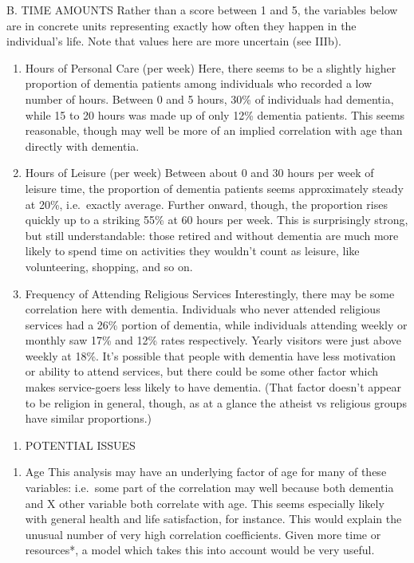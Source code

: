 \documentclass[]{article}
\providecommand{\tightlist}{%
  \setlength{\itemsep}{0pt}\setlength{\parskip}{0pt}}
\begin{document}
B. TIME AMOUNTS Rather than a score between 1 and 5, the variables below
are in concrete units representing exactly how often they happen in the
individual's life. Note that values here are more uncertain (see IIIb).

\begin{enumerate}
\def\labelenumi{\alph{enumi}.}
\item
  Hours of Personal Care (per week) Here, there seems to be a slightly
  higher proportion of dementia patients among individuals who recorded
  a low number of hours. Between 0 and 5 hours, 30\% of individuals had
  dementia, while 15 to 20 hours was made up of only 12\% dementia
  patients. This seems reasonable, though may well be more of an implied
  correlation with age than directly with dementia.
\item
  Hours of Leisure (per week) Between about 0 and 30 hours per week of
  leisure time, the proportion of dementia patients seems approximately
  steady at 20\%, i.e.~exactly average. Further onward, though, the
  proportion rises quickly up to a striking 55\% at 60 hours per week.
  This is surprisingly strong, but still understandable: those retired
  and without dementia are much more likely to spend time on activities
  they wouldn't count as leisure, like volunteering, shopping, and so
  on.
\item
  Frequency of Attending Religious Services Interestingly, there may be
  some correlation here with dementia. Individuals who never attended
  religious services had a 26\% portion of dementia, while individuals
  attending weekly or monthly saw 17\% and 12\% rates respectively.
  Yearly visitors were just above weekly at 18\%. It's possible that
  people with dementia have less motivation or ability to attend
  services, but there could be some other factor which makes
  service-goers less likely to have dementia. (That factor doesn't
  appear to be religion in general, though, as at a glance the atheist
  vs religious groups have similar proportions.)
\end{enumerate}

\begin{enumerate}
\def\labelenumi{\Roman{enumi}.}
\setcounter{enumi}{2}
\tightlist
\item
  POTENTIAL ISSUES
\end{enumerate}

\begin{enumerate}
\def\labelenumi{\alph{enumi}.}
\tightlist
\item
  Age This analysis may have an underlying factor of age for many of
  these variables: i.e.~some part of the correlation may well because
  both dementia and X other variable both correlate with age. This seems
  especially likely with general health and life satisfaction, for
  instance. This would explain the unusual number of very high
  correlation coefficients. Given more time or resources*, a model which
  takes this into account would be very useful.
\end{enumerate}
\end{document}
